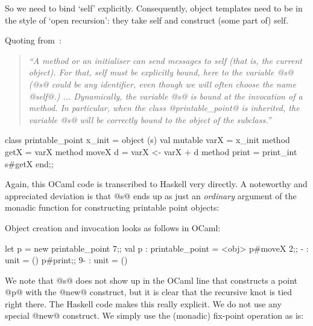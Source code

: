 So we need to bind `self' explicitly. Consequently, object templates
need to be in the style of `open recursion': they take self and
construct (some part of) self.

Quoting from~\cite[\S\,3.2]{OCaml}:

\begin{quote}\itshape\small
``A method or an initialiser can send messages to self (that is, the
current object). For that, self must be explicitly bound, here to the
variable @s@ (@s@ could be any identifier, even though we will often
choose the name @self@.) ... Dynamically, the variable @s@ is bound at
the invocation of a method. In particular, when the class
@printable_point@ is inherited, the variable @s@ will be correctly
bound to the object of the subclass.''
\end{quote}

\begin{code}
 class printable_point x_init =
   object (s)
     val mutable varX = x_init
     method getX      = varX
     method moveX d   = varX <- varX + d
     method print = print_int s#getX
   end;;
\end{code}

\noindent
Again, this OCaml code is transcribed to Haskell very directly. A
noteworthy and appreciated deviation is that @s@ ends up as just an
\emph{ordinary} argument of the monadic function for constructing
printable point objects:

\noindent
Object creation and invocation looks as follows in OCaml:

\begin{code}
 let p = new printable_point 7;;
 val p : printable_point = <obj>
 p#moveX 2;;
 - : unit = ()
 p#print;;
 9- : unit = ()
\end{code}

\noindent
We note that @s@ does not show up in the OCaml line that constructs a
point @p@ with the @new@ construct, but it is clear that the recursive
knot is tied right there. The Haskell code makes this really explicit.
We do not use any special @new@ construct. We simply use the (monadic)
fix-point operation as is:

